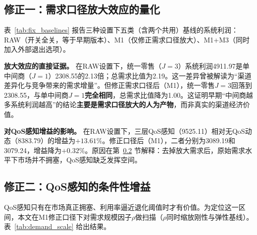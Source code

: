 \documentclass[UTF8,11pt]{ctexart}
\begin{document}
\subsection{修正一：需求口径放大效应的量化}
\label{sec:simulation_results}

表~\ref{tab:fix_baselines} 报告三种设置下五类（含两个共用）基线的系统利润：RAW（开关全关，等于早期版本）、M1（仅修正需求口径放大）、M1+M3（同时加入外部退出选项）。

\begin{table}[H]
\centering
\caption{需求口径修正与外部退出选项对基线结果的影响（系统利润为重跑真实值）。}
\label{tab:fix_baselines}
\small
{}
\end{table}

\textbf{放大效应的直接证据。} 在RAW设置下，统一零售（$J{=}3$）系统利润4911.97是单中间商（$J{=}1$）2308.55的2.13倍；总需求比值为2.19。这一差异曾被解读为“渠道差异化与竞争带来的需求增量”。但修正需求口径后（M1），统一零售$J{=}3$回落到2308.55，与单中间商$J{=}1$\textbf{完全相同}，总需求比值降为1.00。这证明早期“中间商越多系统利润越高”的结论\textbf{主要是需求口径放大的人为产物}，而非真实的渠道经济价值。

\textbf{对QoS感知增益的影响。} 在RAW设置下，三层QoS感知（9525.11）相对无QoS动态（8383.79）的增益为$+13.61\%$。修正口径后（M1），二者分别为3089.19和3079.24，增益降为$\mathbf{+0.32\%}$。原因在第~\ref{sec:conditional_gain} 节解释：去掉放大需求后，原始需求水平下市场并不拥塞，QoS感知缺乏发挥空间。

\subsection{修正二：QoS感知的条件性增益}
\label{sec:conditional_gain}

QoS感知只有在市场真正拥塞、利用率逼近退化阈值时才有价值。为定位这一区间，本文在M1修正口径下对需求规模因子$\rho$做扫描（$\rho$同时缩放刚性与弹性基线）。表~\ref{tab:demand_scale} 给出结果。
\end{document}

